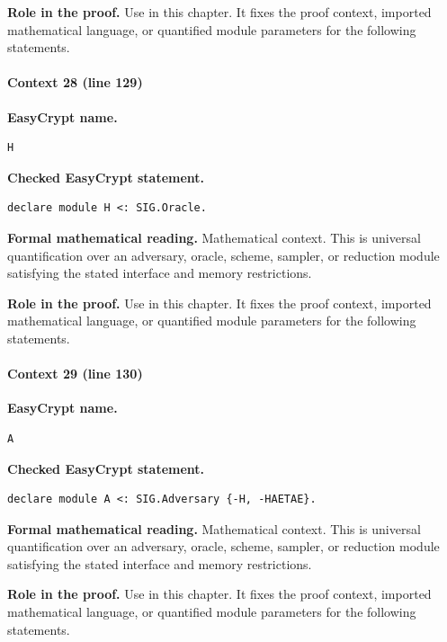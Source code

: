 \noindent\textbf{Role in the proof.}
Use in this chapter. It fixes the proof context, imported mathematical language, or quantified module parameters for the following statements.

\paragraph{Context 28 (line 129)}
\noindent\textbf{EasyCrypt name.}
\begin{lstlisting}[language=EasyCrypt,basicstyle=\ttfamily\scriptsize]
H
\end{lstlisting}
\noindent\textbf{Checked EasyCrypt statement.}
\begin{lstlisting}[language=EasyCrypt,basicstyle=\ttfamily\scriptsize]
declare module H <: SIG.Oracle.
\end{lstlisting}
\noindent\textbf{Formal mathematical reading.}
Mathematical context. This is universal quantification over an adversary, oracle, scheme, sampler, or reduction module satisfying the stated interface and memory restrictions.

\noindent\textbf{Role in the proof.}
Use in this chapter. It fixes the proof context, imported mathematical language, or quantified module parameters for the following statements.

\paragraph{Context 29 (line 130)}
\noindent\textbf{EasyCrypt name.}
\begin{lstlisting}[language=EasyCrypt,basicstyle=\ttfamily\scriptsize]
A
\end{lstlisting}
\noindent\textbf{Checked EasyCrypt statement.}
\begin{lstlisting}[language=EasyCrypt,basicstyle=\ttfamily\scriptsize]
declare module A <: SIG.Adversary {-H, -HAETAE}.
\end{lstlisting}
\noindent\textbf{Formal mathematical reading.}
Mathematical context. This is universal quantification over an adversary, oracle, scheme, sampler, or reduction module satisfying the stated interface and memory restrictions.

\noindent\textbf{Role in the proof.}
Use in this chapter. It fixes the proof context, imported mathematical language, or quantified module parameters for the following statements.

